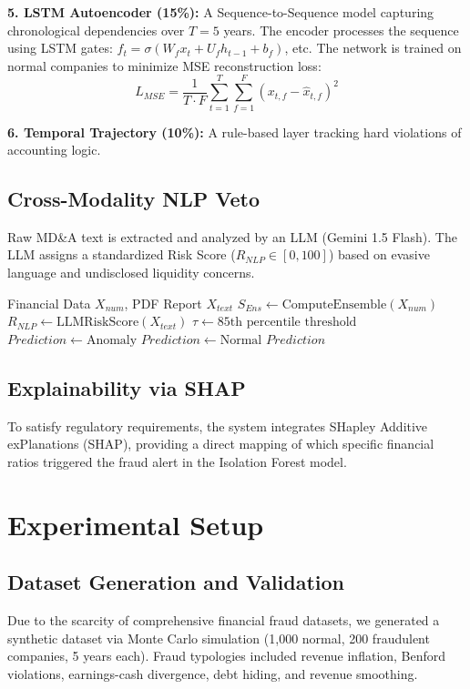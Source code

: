 \documentclass[conference]{IEEEtran}
\begin{document}
\textbf{5. LSTM Autoencoder (15\%):} A Sequence-to-Sequence model capturing chronological dependencies over $T=5$ years. The encoder processes the sequence using LSTM gates: $f_t = \sigma(W_f x_t + U_f h_{t-1} + b_f)$, etc. The network is trained on normal companies to minimize MSE reconstruction loss:
\begin{equation}
    L_{MSE} = \frac{1}{T \cdot F} \sum_{t=1}^{T} \sum_{f=1}^{F} (x_{t,f} - \hat{x}_{t,f})^2
\end{equation}

\textbf{6. Temporal Trajectory (10\%):} A rule-based layer tracking hard violations of accounting logic.

\subsection{Cross-Modality NLP Veto}
Raw MD\&A text is extracted and analyzed by an LLM (Gemini 1.5 Flash). The LLM assigns a standardized Risk Score ($R_{NLP} \in [0, 100]$) based on evasive language and undisclosed liquidity concerns.

\begin{algorithm}
\caption{Dual-Path Inference with NLP Veto}
\begin{algorithmic}[1]
\REQUIRE Financial Data $X_{num}$, PDF Report $X_{text}$
\STATE $S_{Ens} \leftarrow \text{ComputeEnsemble}(X_{num})$
\STATE $R_{NLP} \leftarrow \text{LLMRiskScore}(X_{text})$
\STATE $\tau \leftarrow \text{85th percentile threshold}$
    \STATE $Prediction \leftarrow \text{Anomaly}$
\ELSE
    \STATE $Prediction \leftarrow \text{Normal}$
\ENDIF
\RETURN $Prediction$
\end{algorithmic}
\end{algorithm}

\subsection{Explainability via SHAP}
To satisfy regulatory requirements, the system integrates SHapley Additive exPlanations (SHAP), providing a direct mapping of which specific financial ratios triggered the fraud alert in the Isolation Forest model.

\section{Experimental Setup}

\subsection{Dataset Generation and Validation}
Due to the scarcity of comprehensive financial fraud datasets, we generated a synthetic dataset via Monte Carlo simulation (1,000 normal, 200 fraudulent companies, 5 years each). Fraud typologies included revenue inflation, Benford violations, earnings-cash divergence, debt hiding, and revenue smoothing. 
\end{document}
